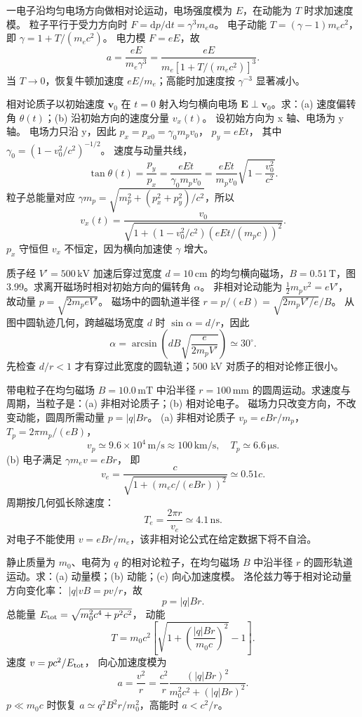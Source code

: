 一电子沿均匀电场方向做相对论运动，电场强度模为 $E$，在动能为 $T$ 时求加速度模。
\exsolution
粒子平行于受力方向时
$F=\mathrm dp/\mathrm dt=\gamma^3m_e a$。
电子动能
$T=(\gamma-1)m_ec^2$，即
$\gamma=1+T/(m_ec^2)$。
电力模 $F=eE$，故
\[
\boxed{a=\frac{eE}{m_e\gamma^3}
=\frac{eE}{m_e[1+T/(m_ec^2)]^3}}.
\]
\excheck 当 $T\to0$，恢复牛顿加速度 $eE/m_e$；高能时加速度按 $\gamma^{-3}$ 显著减小。

相对论质子以初始速度 $\bm v_0$ 在 $t=0$ 射入均匀横向电场 $\bm E\perp\bm v_0$。求：(a) 速度偏转角 $\theta(t)$；(b) 沿初始方向的速度分量 $v_x(t)$。
\exsolution
设初始方向为 x 轴、电场为 y 轴。
电场力只沿 y，因此
$p_x=p_{x0}=\gamma_0m_pv_0$，
$p_y=eEt$，
其中 $\gamma_0=(1-v_0^2/c^2)^{-1/2}$。
速度与动量共线，
\[
\boxed{\tan\theta(t)=\frac{p_y}{p_x}
=\frac{eEt}{\gamma_0m_pv_0}
=\frac{eEt}{m_pv_0}
\sqrt{1-\frac{v_0^2}{c^2}}}.
\]
粒子总能量对应
$\gamma m_p=\sqrt{m_p^2+(p_x^2+p_y^2)/c^2}$，所以
\[
\boxed{v_x(t)=
\frac{v_0}{\sqrt{1+
(1-v_0^2/c^2)(eEt/(m_pc))^2}}}.
\]
\excheck $p_x$ 守恒但 $v_x$ 不恒定，因为横向加速使 $\gamma$ 增大。

质子经 $V'=500\,\mathrm{kV}$ 加速后穿过宽度 $d=10\,\mathrm{cm}$ 的均匀横向磁场，$B=0.51\,\mathrm T$，图3.99。求离开磁场时相对初始方向的偏转角 $\alpha$。
\exsolution
非相对论动能为
$\frac12m_pv^2=eV'$，
故动量
$p=\sqrt{2m_peV'}$。
磁场中的圆轨道半径
$r=p/(eB)=\sqrt{2m_pV'/e}/B$。
从图中圆轨迹几何，跨越磁场宽度 $d$ 时
$\sin\alpha=d/r$，因此
\[
\boxed{\alpha=
\arcsin\left(dB\sqrt{\frac{e}{2m_pV'}}\right)
\simeq30^\circ}.
\]
\excheck 先检查 $d/r<1$ 才有穿过此宽度的圆轨道；500 kV 对质子的相对论修正很小。

带电粒子在均匀磁场 $B=10.0\,\mathrm{mT}$ 中沿半径 $r=100\,\mathrm{mm}$ 的圆周运动。求速度与周期，当粒子是：(a) 非相对论质子；(b) 相对论电子。
\exsolution
磁场力只改变方向，不改变动能，圆周所需动量
$p=|q|Br$。
(a) 非相对论质子
$v_p=eBr/m_p$，
$T_p=2\pi m_p/(eB)$，
\[
\boxed{v_p\simeq9.6\times10^4\,\mathrm{m/s}
\approx100\,\mathrm{km/s}},\quad
\boxed{T_p\simeq6.6\,\mathrm{\mu s}}.
\]
(b) 电子满足
$\gamma m_ev=eBr$，
即
\[
\boxed{v_e=\frac c{\sqrt{1+(m_ec/(eBr))^2}}
\simeq0.51c}.
\]
周期按几何弧长除速度：
\[
\boxed{T_e=\frac{2\pi r}{v_e}\simeq4.1\,\mathrm{ns}}.
\]
\excheck 对电子不能使用 $v=eBr/m_e$，该非相对论公式在给定数据下将不自洽。

静止质量为 $m_0$、电荷为 $q$ 的相对论粒子，在均匀磁场 $B$ 中沿半径 $r$ 的圆形轨道运动。求：(a) 动量模；(b) 动能；(c) 向心加速度模。
\exsolution
洛伦兹力等于相对论动量方向变化率：
$|q|vB=pv/r$，故
\[
\boxed{p=|q|Br}.
\]
总能量
$E_{\rm tot}=\sqrt{m_0^2c^4+p^2c^2}$，
动能
\[
\boxed{T=
m_0c^2\left[\sqrt{1+
\left(\frac{|q|Br}{m_0c}\right)^2}-1\right]}.
\]
速度
$v=pc^2/E_{\rm tot}$，
向心加速度模为
\[
\boxed{a=\frac{v^2}{r}
=\frac{c^2}{r}
\frac{(|q|Br)^2}{m_0^2c^2+(|q|Br)^2}}.
\]
\excheck $p\ll m_0c$ 时恢复 $a\simeq q^2B^2r/m_0^2$，高能时 $a<c^2/r$。

